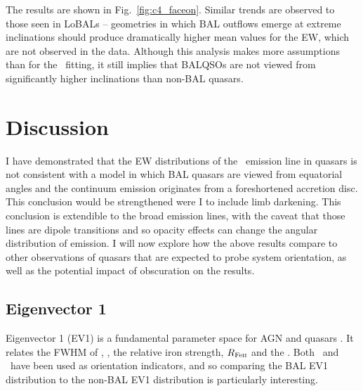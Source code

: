 The results are shown in Fig.~\ref{fig:c4_faceon}. 
Similar trends are observed to those seen in LoBALs -- geometries
in which BAL outflows emerge at extreme inclinations should produce
dramatically higher mean values for the EW, which are not observed in 
the data. Although this analysis makes more assumptions than for the \ewo\
fitting, it still implies that BALQSOs are not viewed from significantly 
higher inclinations than non-BAL quasars.


\section{Discussion}
\label{sec:discuss_ew}
I have demonstrated that the EW distributions of the 
\oiiifull\ emission line in quasars is not consistent with a 
model in which BAL quasars are viewed from equatorial angles 
and the continuum emission originates from
a foreshortened accretion disc. This conclusion would be strengthened were 
I to include limb darkening. This conclusion is extendible to the broad 
emission lines, with the caveat that those lines are dipole 
transitions and so opacity effects can change the angular distribution of 
emission. I will now explore how the above results compare to other
observations of quasars that are expected to probe system orientation, as 
well as the potential impact of obscuration on the results.

\subsection{Eigenvector 1}


Eigenvector 1 (EV1) is a fundamental parameter space for AGN and quasars
\citep{borosongreen,sulentic2000ev1,marziani2001,shenho2014}. 
It relates the 
FWHM of \hb, \fwh, the relative iron strength, 
$R_{{\rm Fe \textsc{ii}}}$ and
the \ewo. Both \ewo\ and \fwh\ have been used as orientation
indicators, and so comparing the BAL EV1 distribution to the non-BAL EV1 
distribution is particularly interesting. 

